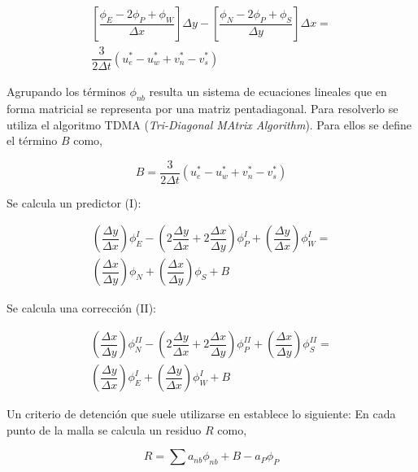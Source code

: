 \begin{equation} \label{poisson_discreto}
\begin{split}
\left[ \dfrac{\phi_E-2\phi_P+\phi_W}{\Delta x} \right] \Delta y - \left[ \dfrac{\phi_N-2\phi_P+\phi_S}{\Delta y} \right] \Delta x = \\ \dfrac{3}{2 \Delta t} \left( u_e^* - u_w^* + v_n^* - v_s^* \right)
\end{split}  
\end{equation}

Agrupando los términos $\phi_{nb}$ resulta un sistema de ecuaciones lineales que en forma matricial se representa por una matriz pentadiagonal. Para resolverlo se utiliza el algoritmo TDMA (\textit{Tri-Diagonal MAtrix Algorithm}). Para ellos se define el término $B$ como,

\begin{equation}
B =  \dfrac{3}{2 \Delta t} \left( u_e^* - u_w^* + v_n^* - v_s^* \right)
\end{equation}

Se calcula un predictor (I):

\begin{equation}
\begin{split}
\left( \dfrac{\Delta y}{\Delta x} \right) \phi_E^I - \left( 2 \dfrac{\Delta y}{\Delta x} + 2 \dfrac{\Delta x}{\Delta y} \right) \phi_P^I + \left( \dfrac{\Delta y}{\Delta x} \right) \phi_W^I = \\ \left( \dfrac{\Delta x}{\Delta y} \right) \phi_N + \left( \dfrac{\Delta x}{\Delta y} \right) \phi_S + B
\end{split}
\end{equation}

Se calcula una corrección (II):

\begin{equation}
\begin{split}
\left( \dfrac{\Delta x}{\Delta y} \right) \phi_N^{II} - \left( 2 \dfrac{\Delta y}{\Delta x} + 2 \dfrac{\Delta x}{\Delta y} \right) \phi_P^{II} + \left( \dfrac{\Delta x}{\Delta y} \right) \phi_S^{II} = \\ \left( \dfrac{\Delta y}{\Delta x} \right) \phi_E^I + \left( \dfrac{\Delta y}{\Delta x} \right) \phi_W^I + B
\end{split}
\end{equation}

Un criterio de detención que suele utilizarse en establece lo siguiente: En cada punto de la malla se calcula un residuo $R$ como,

\begin{equation}
R = \sum a_{nb} \phi_{nb} + B - a_P \phi_P 
\end{equation}


